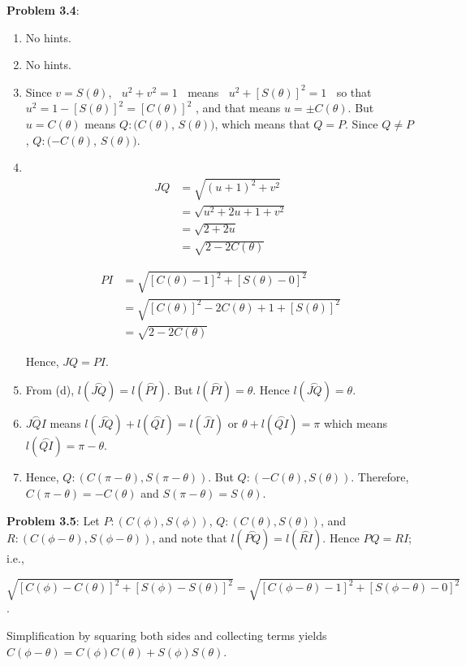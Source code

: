 \documentclass[english]{book}
\newcommand{\arc}[1]{\overset{\frown}{#1} }
\begin{document}
\textbf{Problem 3.4}:
\begin{enumerate}[\hspace{1cm}a)]
  \item No hints.
  \item No hints.
  \item Since $v = S(\theta)$, $\ $ $u^{2} + v^{2} = 1$ $\ $ means $\ $ $u^{2} + [S(\theta)]^{2} = 1$ $\ $ so that $u^{2} = 1 - [S(\theta)]^{2} = [C(\theta)]^{2}$ , and that means $u = \pm C(\theta)$. But $u = C(\theta)$ means $Q:(C(\theta)$, $S(\theta))$, which means that $Q = P$. Since $Q \neq P$, $Q:(-C(\theta)$, $S(\theta))$.
  \item $\ $
      \begin{align*}
      JQ & = \sqrt{(u+1)^{2}+v^{2}} \\
         & = \sqrt{u^{2}+2u+1+v^{2}} \\
         & = \sqrt{2+2u} \\
         & = \sqrt{2-2C(\theta)}
      \end{align*}

      \begin{align*}
      PI & = \sqrt{[C(\theta)-1]^{2} + [S(\theta)-0]^{2}} \\
         & = \sqrt{[C(\theta)]^{2} -2C(\theta)+1 + [S(\theta)]^{2}} \\
         & = \sqrt{2 - 2C(\theta)}
      \end{align*}

      Hence, $JQ=PI$.
  \item From (d), $l(\arc{JQ}) = l(\arc{PI})$. But $l(\arc{PI}) = \theta$. Hence $l(\arc{JQ}) = \theta$.
  \item $\arc{JQI}$ means $l(\arc{JQ}) + l(\arc{QI}) = l(\arc{JI})$ or $\theta + l(\arc{QI}) = \pi$ which means $l(\arc{QI}) = \pi-\theta$.
  \item Hence, $Q:(C(\pi-\theta),S(\pi-\theta))$. But $Q:(-C(\theta), S(\theta))$. Therefore, $C(\pi-\theta) = -C(\theta)$ and $S(\pi-\theta) = S(\theta)$.
\end{enumerate}

\textbf{Problem 3.5}: Let $P:(C(\phi),S(\phi))$, $Q:(C(\theta),S(\theta))$, and $R:(C(\phi-\theta),S(\phi-\theta))$, and note that $l(\arc{PQ}) = l(\arc{RI})$. Hence $PQ = RI$; i.e., 

$\sqrt{[C(\phi)-C(\theta)]^{2}+[S(\phi)-S(\theta)]^{2}} = \sqrt{[C(\phi-\theta)-1]^{2}+ [S(\phi-\theta)-0]^{2}}$. 

Simplification by squaring both sides and collecting terms yields $C(\phi-\theta) = C(\phi) C(\theta) + S(\phi) S(\theta)$.
\end{document}
